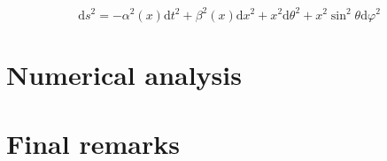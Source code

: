 \documentclass{article}
\begin{document}
\begin{equation}
    \mathrm{d}s^2 = -\alpha^2(x) \mathrm{d}t^2 + \beta^2(x)\mathrm{d}x^2
    + x^2\mathrm{d}\theta^2 + x^2\sin^2\theta\mathrm{d}\varphi^2
\end{equation}



\section{Numerical analysis}
\label{sec:numercal_analysis}

\section{Final remarks}
\label{sec:remarks}
\end{document}
